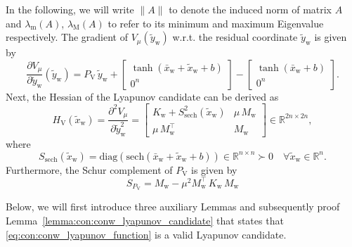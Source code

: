 In the following, we will write $\lVert A \rVert$ to denote the induced norm of matrix $A$ and $\lambda_\mathrm{m}(A)$, $\lambda_\mathrm{M}(A)$ to refer to its minimum and maximum Eigenvalue respectively.
% 
The gradient of $V_\mu(\tilde{y}_\mathrm{w})$ w.r.t. the residual coordinate $\tilde{y}_\mathrm{w}$ is given by
\begin{equation}\label{eq:con:V_mu_gradient}
    \frac{\partial V_\mu}{\partial \tilde{y}_\mathrm{w}}(\tilde{y}_\mathrm{w}) = P_\mathrm{V} \, \tilde{y}_\mathrm{w} + 
    \begin{bmatrix}
        \tanh(\bar{x}_\mathrm{w} + \tilde{x}_\mathrm{w} + b)\\ 
        0^{n}
    \end{bmatrix} - \begin{bmatrix}
        \tanh(\bar{x}_\mathrm{w} + b)\\ 
        0^{n}
    \end{bmatrix}.
\end{equation}
Next, the Hessian of the Lyapunov candidate can be derived as
\begin{equation}\label{eq:con:V_mu_hessian}
    H_\mathrm{V}(\tilde{x}_\mathrm{w}) = \frac{\partial^2 V_\mu}{\partial \tilde{y}_\mathrm{w}^2} = \begin{bmatrix}
        K_\mathrm{w} + S_\mathrm{sech}^{2}(\tilde{x}_\mathrm{w}) & \mu \, M_\mathrm{w}\\
        \mu \, M_\mathrm{w}^\top & M_\mathrm{w}
    \end{bmatrix} \in \mathbb{R}^{2n \times 2n},
\end{equation}
where
\begin{equation}\label{eq:con:S_sech_definition}
    S_\mathrm{sech}(\tilde{x}_\mathrm{w}) = \mathrm{diag}(\mathrm{sech}(\bar{x}_\mathrm{w} + \tilde{x}_\mathrm{w} + b)) \in \mathbb{R}^{n \times n} \succ 0 \quad \forall \tilde{x}_\mathrm{w} \in \mathbb{R}^n.
\end{equation}
Furthermore, the Schur complement of $P_\mathrm{V}$ is given by
\begin{equation}\label{eq:con:P_V_Schur_complement}
    S_{P_\mathrm{V}} = M_\mathrm{w} - \mu^2 M_\mathrm{w}^\top \, K_\mathrm{w} \, M_\mathrm{w}
\end{equation}

Below, we will first introduce three auxiliary Lemmas and subsequently proof Lemma~\ref{lemma:con:conw_lyapunov_candidate} that states that \eqref{eq:con:conw_lyapunov_function} is a valid Lyapunov candidate.

